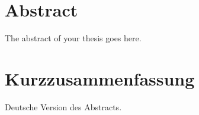 \section{Abstract}
The abstract of your thesis goes here.

\lipsum[1-6]

\section{Kurzzusammenfassung}

Deutsche Version des Abstracts.

\lipsum[1-6]